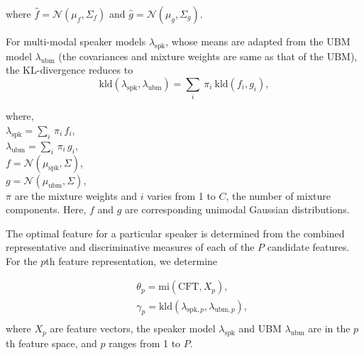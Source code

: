 \documentclass{article}
\begin{document}
where $\hat{f} = \mathcal{N}(\mu_f,\Sigma_f)$ and $\hat{g} = \mathcal{N}(\mu_g,\Sigma_g)$.

For multi-modal speaker models $\lambda_{\textrm{spk}}$, whose means are adapted from the UBM model
$\lambda_{\textrm{ubm}}$ (the covariances and mixture weights are same as that of the UBM), 
the KL-divergence reduces to 
\begin{equation}
\textrm{kld}(\lambda_{\textrm{spk}},\lambda_{\textrm{ubm}}) = 
	\displaystyle \sum_i\ \pi_i\ \textrm{kld}(f_i,g_i),
\label{eq:gmmAdaptedKLD}
\end{equation}


where, \\
$\lambda_{\textrm{spk}} = \displaystyle \sum_i \, \pi_i \, f_i$, \\
$\lambda_{\textrm{ubm}} = \displaystyle\sum_i \, \pi_i \, g_i$, \\
$f = \mathcal{N}(\mu_{\textrm{spk}},\Sigma)$, \\
$g = \mathcal{N}(\mu_{\textrm{ubm}},\Sigma)$, \\
$\pi$ are the mixture weights and
$i$ varies from 1 to $C$, the number of mixture components. Here, $f$ and $g$ are
corresponding unimodal Gaussian distributions.


The optimal feature for a particular speaker is determined from the combined
representative and discriminative measures of each of the $P$ candidate
features. For the $p$th feature representation, we determine

\begin{eqnarray*}
&& \theta_p = \textrm{mi}(\textrm{CFT},X_{p}), \\
&& \gamma_p =
\textrm{kld}(\lambda_{\textrm{spk},p},\lambda_{\textrm{ubm},p}), \\
\end{eqnarray*} 
where $X_p$ are feature vectors, the speaker model $\lambda_{\textrm{spk}}$ and 
UBM $\lambda_{\textrm{ubm}}$ are in the $p$th feature space, and $p$ ranges from 1 to $P$.


\end{document}
